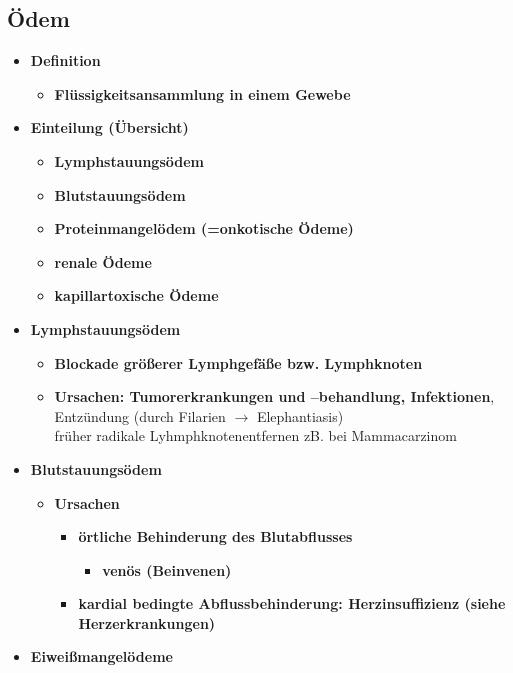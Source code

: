 \subsection{Ödem}
	\begin{itemize}
		\item \textbf{Definition}
			\begin{itemize}
				\item \textbf{Flüssigkeitsansammlung in einem Gewebe}
			\end{itemize}
		\item \textbf{Einteilung (Übersicht)}
			\begin{itemize}
				\item \textbf{Lymphstauungsödem}
				\item \textbf{Blutstauungsödem}
				\item \textbf{Proteinmangelödem (=onkotische Ödeme)}
				\item \textbf{renale Ödeme}
				\item \textbf{kapillartoxische Ödeme}
			\end{itemize}
		\item \textbf{Lymphstauungsödem}
			\begin{itemize}
				\item \textbf{Blockade größerer Lymphgefäße bzw. Lymphknoten}
				\item \textbf{Ursachen: Tumorerkrankungen und –behandlung, Infektionen}, Entzündung (durch Filarien $\rightarrow$ Elephantiasis)\\
					früher radikale Lyhmphknotenentfernen zB. bei Mammacarzinom
			\end{itemize}
		\item \textbf{Blutstauungsödem}
			\begin{itemize}
				\item \textbf{Ursachen}
					\begin{itemize}
						\item \textbf{örtliche Behinderung des Blutabflusses}
							\begin{itemize}
								\item \textbf{venös (Beinvenen)}
							\end{itemize}
						\item \textbf{kardial bedingte Abflussbehinderung: Herzinsuffizienz (siehe Herzerkrankungen)}
					\end{itemize}
			\end{itemize}
		\item \textbf{Eiweißmangelödeme}
			\begin{itemize}

\end{itemize}
\end{itemize}
